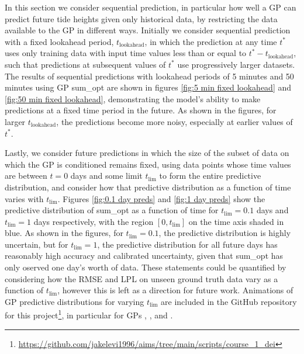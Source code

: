 In this section we consider sequential prediction, in particular how well a GP can predict future tide heights given only historical data, by restricting the data available to the GP in different ways. Initially we consider sequential prediction with a fixed lookahead period, $t_{\text{lookahead}}$, in which the prediction at any time $t^*$ uses only training data with input time values less than or equal to $t^* - t_{\text{lookahead}}$, such that predictions at subsequent values of $t^*$ use progressively larger datasets. The results of sequential predictions with lookahead periods of 5 minutes and 50 minutes using GP sum\_opt are shown in figures \ref{fig:5 min fixed lookahead} and \ref{fig:50 min fixed lookahead}, demonstrating the model's ability to make predictions at a fixed time period in the future. As shown in the figures, for larger $t_{\text{lookahead}}$, the predictions become more noisy, especially at earlier values of $t^*$.

Lastly, we consider future predictions in which the size of the subset of data on which the GP is conditioned remains fixed, using data points whose time values are between $t=0$ days and some limit $t_\text{lim}$ to form the entire predictive distribution, and consider how that predictive distribution as a function of time varies with $t_\text{lim}$. Figures \ref{fig:0.1 day preds} and \ref{fig:1 day preds} show the predictive distribution of sum\_opt as a function of time for $t_\text{lim}=0.1$ days and $t_\text{lim}=1$ days respectively, with the region $\left[0, t_\text{lim}\right]$ on the time axis shaded in blue. As shown in the figures, for $t_\text{lim}=0.1$, the predictive distribution is highly uncertain, but for $t_\text{lim}=1$, the predictive distribution for all future days has reasonably high accuracy and calibrated uncertainty, given that sum\_opt has only oserved one day's worth of data. These statements could be quantified by considering how the RMSE and LPL on unseen ground truth data vary as a function of  $t_\text{lim}$, however this is left as a direction for future work. Animations of GP predictive distributions for varying $t_\text{lim}$ are included in the GitHub repository for this project\footnote{\url{https://github.com/jakelevi1996/aims/tree/main/scripts/course_1_dei}}, in particular for GPs \href{https://github.com/jakelevi1996/aims/blob/main/scripts/course_1_dei/Results/Protected/sequential_predictions_sqe_opt.gif}{\color{blue}{sqe\_opt}}, \href{https://github.com/jakelevi1996/aims/blob/main/scripts/course_1_dei/Results/Protected/sequential_predictions_prod_opt.gif}{\color{blue}{prod\_opt}}, and \href{https://github.com/jakelevi1996/aims/blob/main/scripts/course_1_dei/Results/Protected/sequential_predictions_sum_opt.gif}{\color{blue}{sum\_opt}}.
